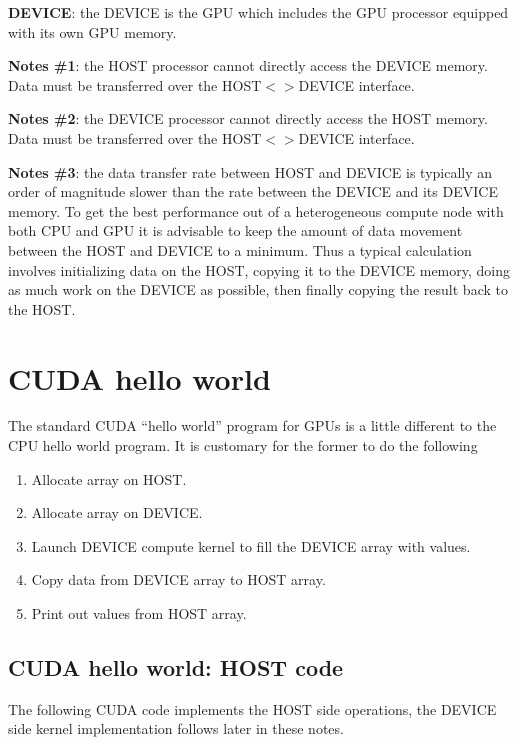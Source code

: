 {\bf DEVICE}: the DEVICE is the GPU which includes the GPU processor equipped with its own GPU memory.

{\bf Notes \#1}: the HOST processor cannot directly access the DEVICE memory. Data must be transferred over the HOST$<>$DEVICE interface.

{\bf Notes \#2}: the DEVICE processor cannot directly access the HOST memory. Data must be transferred over the HOST$<>$DEVICE interface.

{\bf Notes \#3}: the data transfer rate between HOST and DEVICE is typically an order of magnitude slower than the rate between the DEVICE and its DEVICE memory. To get the best performance out of a heterogeneous compute node with both CPU and GPU it is advisable to keep the amount of data movement between the HOST and DEVICE to a minimum. Thus a typical calculation involves initializing data on the HOST, copying it to the DEVICE memory, doing as much work on the DEVICE as possible, then finally copying the result back to the HOST.

\section{CUDA hello world}

The standard CUDA ``hello world'' program for GPUs is a little different to the CPU hello world program. It is customary for the former to do the following
\begin{enumerate}
\setlength\itemsep{2pt}
    \item Allocate array on HOST.
    \item Allocate array on DEVICE.
    \item Launch DEVICE compute kernel to fill the DEVICE array with values.
    \item Copy data from DEVICE array to HOST array.
    \item Print out values from HOST array.
\end{enumerate}

\subsection{CUDA hello world: HOST code}

The following CUDA code implements the HOST side operations, the DEVICE side kernel implementation follows later in these notes. 

